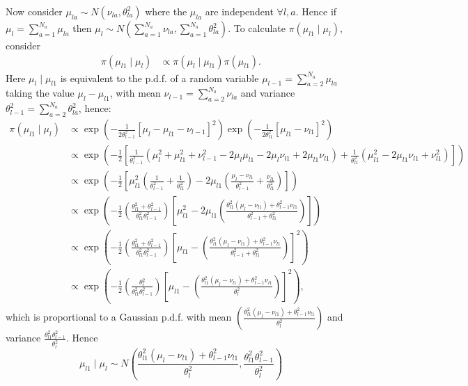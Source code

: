 \documentclass[a4paper]{article}
\begin{document}
Now consider $\mu_{la} \sim N\left(\nu_{la}, \theta^2_{la}\right)$ where the $\mu_{la}$ are independent $\forall l, a$. Hence if $\mu_l = \sum_{a = 1}^{N_a} \mu_{la}$ then $\mu_l \sim N\left(\sum_{a=1}^{N_a} \nu_{la}, \sum_{a = 1}^{N_a} \theta^2_{la}\right)$. To calculate $\pi\left(\mu_{l1} \mid \mu_l\right)$, consider
\begin{align*}
    \pi\left(\mu_{l1} \mid \mu_l\right) &\propto \pi\left(\mu_l \mid \mu_{l1}\right)\pi\left(\mu_{l1}\right).
\end{align*}
Here $\mu_l \mid \mu_{l1}$ is equivalent to the p.d.f. of a random variable $\mu_{l - 1} = \sum_{a = 2}^{N_a} \mu_{la}$ taking the value $\mu_l - \mu_{l1}$, with mean $\nu_{l - 1} = \sum_{a = 2}^{N_a} \nu_{la}$ and variance $\theta^2_{l - 1} = \sum_{a = 2}^{N_a} \theta^2_{la}$, hence:
\begin{align}
    \pi\left(\mu_{l1} \mid \mu_l\right) &\propto \exp\left(-\frac{1}{2\theta^2_{l - 1}}\left[\mu_l - \mu_{l1} - \nu_{l - 1}\right]^2\right)\exp\left(-\frac{1}{2\theta^2_{l1}}\left[\mu_{l1} - \nu_{l1}\right]^2\right) \nonumber\\
    &\propto \exp\left(-\frac{1}{2}\left[\frac{1}{\theta^2_{l - 1}}\left(\mu^2_l + \mu^2_{l1} + \nu^2_{l - 1} - 2 \mu_l\mu_{l1} - 2 \mu_l\nu_{l1} + 2 \mu_{l1}\nu_{l1}\right) + \frac{1}{\theta^2_{l1}}\left(\mu^2_{l1} - 2\mu_{l1}\nu_{l1} + \nu^2_{l1}\right)\right]\right)\nonumber\\
    &\propto \exp\left(-\frac{1}{2}\left[\mu^2_{l1}\left(\frac{1}{\theta^2_{l - 1}} + \frac{1}{\theta^2_{l1}}\right) - 2 \mu_{l1}\left(\frac{\mu_l - \nu_{l1}}{\theta^2_{l - 1}} + \frac{\nu_{l1}}{\theta^2_{l1}}\right)\right]\right)\nonumber\\
    &\propto \exp\left(-\frac{1}{2}\left(\frac{\theta^2_{l1} + \theta^2_{l - 1}}{\theta^2_{l1}\theta^2_{l - 1}}\right)\left[\mu^2_{l1} - 2 \mu_{l1}\left(\frac{\theta^2_{l1}\left(\mu_l - \nu_{l1}\right) + \theta^2_{l - 1}\nu_{l1}}{\theta^2_{l - 1} + \theta^2_{l1}}\right)\right]\right)\nonumber\\
    &\propto \exp\left(-\frac{1}{2}\left(\frac{\theta^2_{l1} + \theta^2_{l - 1}}{\theta^2_{l1}\theta^2_{l - 1}}\right)\left[\mu_{l1} - \left(\frac{\theta^2_{l1}\left(\mu_l - \nu_{l1}\right) + \theta^2_{l - 1}\nu_{l1}}{\theta^2_{l - 1} + \theta^2_{l1}}\right)\right]^2\right)\nonumber\\
    &\propto \exp\left(-\frac{1}{2}\left(\frac{\theta^2_l}{\theta^2_{l1}\theta^2_{l - 1}}\right)\left[\mu_{l1} - \left(\frac{\theta^2_{l1}\left(\mu_l - \nu_{l1}\right) + \theta^2_{l - 1}\nu_{l1}}{\theta^2_l}\right)\right]^2\right),
\end{align}
which is proportional to a Gaussian p.d.f. with mean $\left(\frac{\theta^2_{l1}\left(\mu_l - \nu_{l1}\right) + \theta^2_{l - 1}\nu_{l1}}{\theta^2_l}\right)$ and variance $\frac{\theta^2_{l1}\theta^2_{l - 1}}{\theta^2_l}$. Hence
\begin{equation}
    \mu_{l1} \mid \mu_l \sim N\left(\frac{\theta^2_{l1}\left(\mu_l - \nu_{l1}\right) + \theta^2_{l - 1}\nu_{l1}}{\theta^2_l}, \frac{\theta^2_{l1}\theta^2_{l - 1}}{\theta^2_l}\right) \label{eq:mu1gmu}
\end{equation}
\end{document}
